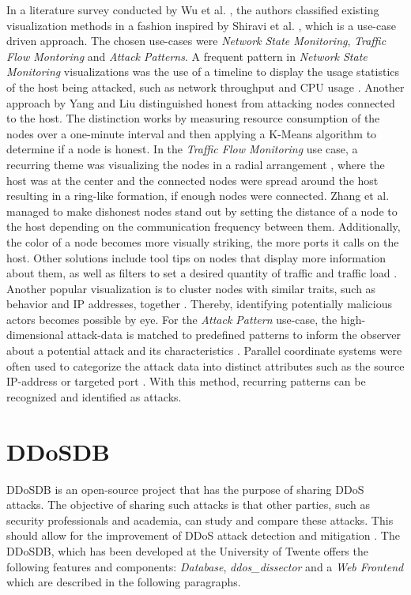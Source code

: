 In a literature survey conducted by Wu et al. \cite{wu}, the authors classified existing visualization methods in a fashion inspired by Shiravi et al. \cite{shiravi}, which is a use-case driven approach. The chosen use-cases were \textit{Network State Monitoring}, \textit{Traffic Flow Montoring} and \textit{Attack Patterns}. A frequent pattern in \textit{Network State Monitoring} visualizations was the use of a timeline to display the usage statistics of the host being attacked, such as network throughput and CPU usage \cite{chen, lee}. Another approach by Yang and Liu \cite{yang} distinguished honest from attacking nodes connected to the host. The distinction works by measuring resource consumption of the nodes over a one-minute interval and then applying a K-Means algorithm to determine if a node is honest. 
In the \textit{Traffic Flow Monitoring} use case, a recurring theme was visualizing the nodes in a radial arrangement \cite{zhangRadial, pearlman, barbosa}, where the host was at the center and the connected nodes were spread around the host resulting in a ring-like formation, if enough nodes were connected. Zhang et al. \cite{zhangRadial} managed to make dishonest nodes stand out by setting the distance of a node to the host depending on the communication frequency between them. Additionally, the color of a node becomes more visually striking, the more ports it calls on the host. Other solutions include tool tips on nodes that display more information about them, as well as filters to set a desired quantity of traffic and traffic load \cite{barbosa}. Another popular visualization is to cluster nodes with similar traits, such as behavior and IP addresses, together \cite{zhangCluster}. Thereby, identifying potentially malicious actors becomes possible by eye.
For the \textit{Attack Pattern} use-case, the high-dimensional attack-data is matched to predefined patterns to inform the observer about a potential attack and its characteristics \cite{wu}. Parallel coordinate systems were often used to categorize the attack data into distinct attributes such as the source IP-address or targeted port \cite{choi, lee, okada}. With this method, recurring patterns can be recognized and identified as attacks.

\section{DDoSDB}\label{ddosdb}
DDoSDB is an open-source project that has the purpose of sharing DDoS attacks. The objective of sharing such attacks is that other parties, such as security professionals and academia, can study and compare these attacks. This should allow for the improvement of DDoS attack detection and mitigation \cite{ddosdb-help}.
The DDoSDB, which has been developed at the University of Twente offers the following features and components: \emph{Database}, \emph{ddos\_dissector} and a \emph{Web Frontend} which are described in the following paragraphs.

